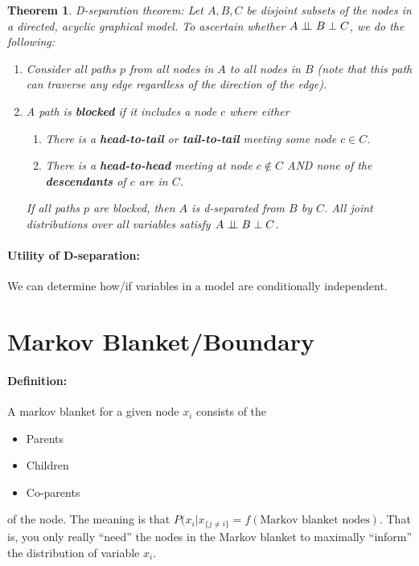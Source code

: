 \documentclass[a4paper,12pt]{report}
\newtheorem{theorem}{Theorem}
\begin{document}
\begin{theorem}{D-separation theorem: }
Let $A,B,C$ be disjoint subsets of the nodes in a directed, acyclic graphical model.  To ascertain whether $A \perp\!\!\!\perp B \perp C$, we do the following:
\begin{enumerate}
\item Consider all paths $p$ from all nodes in $A$ to all nodes in $B$ (note that this path can traverse any edge regardless of the direction of the edge).
\item A path is \textbf{blocked} if it includes a node $c$ where either
\begin{enumerate}
\item There is a \textbf{head-to-tail} or \textbf{tail-to-tail} meeting some node $c\in C$.
\item There is a \textbf{head-to-head} meeting at node $c\notin C$ AND none of the \textbf{descendants} of $c$ are in $C$.
\end{enumerate}

If all paths $p$ are blocked, then $A$ is d-separated from $B$ by $C$. All joint distributions over all variables satisfy $A \perp\!\!\!\perp B \perp C$.
\end{enumerate}
\end{theorem}

\paragraph{Utility of D-separation: } We can determine how/if variables in a model are conditionally independent.


\section{Markov Blanket/Boundary}

\paragraph{Definition: } A markov blanket for a given node $x_i$ consists of the 
\begin{itemize}
\item Parents
\item Children
\item Co-parents
\end{itemize}
of the node. The meaning is that $P(x_i|x_{\{j\neq i\}} = f(\text{Markov blanket nodes})$. That is, you only really ``need'' the nodes in the Markov blanket to maximally ``inform'' the distribution of variable $x_i$.
\end{document}
